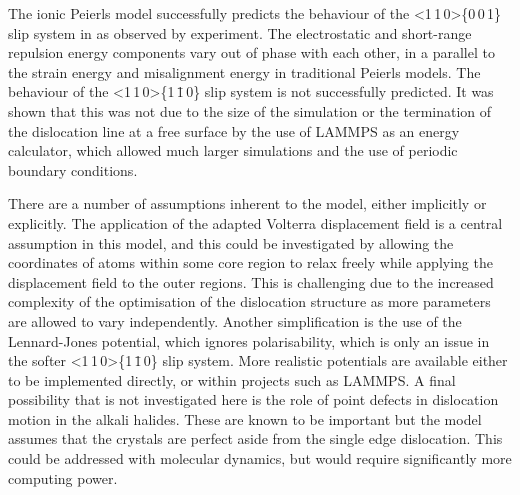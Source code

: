 The ionic Peierls model successfully predicts the behaviour of the <1\,1\,0>\{0\,0\,1\} slip system in  as observed by experiment. The electrostatic and short-range repulsion energy components vary out of phase with each other, in a parallel to the strain energy and misalignment energy in traditional Peierls models. The behaviour of the <1\,1\,0>\{1\,\={1}\,0\} slip system is not successfully predicted. It was shown that this was not due to the size of the simulation or the termination of the dislocation line at a free surface by the use of LAMMPS as an energy calculator, which allowed much larger simulations and the use of periodic boundary conditions. 

There are a number of assumptions inherent to the model, either implicitly or explicitly. The application of the adapted Volterra displacement field is a central assumption in this model, and this could be investigated by allowing the coordinates of atoms within some core region to relax freely while applying the displacement field to the outer regions. This is challenging due to the increased complexity of the optimisation of the dislocation structure as more parameters are allowed to vary independently. Another simplification is the use of the Lennard-Jones potential, which ignores polarisability, which is only an issue in the softer <1\,1\,0>\{1\,\={1}\,0\} slip system. More realistic potentials are available either to be implemented directly, or within projects such as LAMMPS. A final possibility that is not investigated here is the role of point defects in dislocation motion in the alkali halides. These are known to be important but the model assumes that the crystals are perfect aside from the single edge dislocation. This could be addressed with molecular dynamics, but would require significantly more computing power.






















